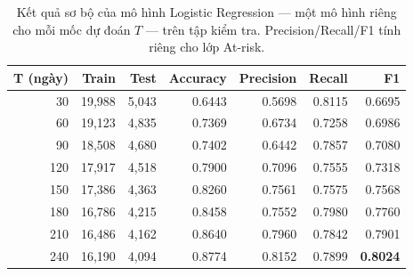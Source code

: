\begin{table}[H]
  \centering
  \caption{Kết quả sơ bộ của mô hình Logistic Regression --- một mô hình riêng cho mỗi mốc dự đoán $T$ --- trên tập kiểm tra. Precision/Recall/F1 tính riêng cho lớp At-risk.}
  \label{tab:snapshot_results}
  \small
  \begin{tabular}{rrrrrrr}
    \toprule
    \textbf{T (ngày)} & \textbf{Train} & \textbf{Test} & \textbf{Accuracy} & \textbf{Precision} & \textbf{Recall} & \textbf{F1} \\
    \midrule
    30 & 19{,}988 & 5{,}043 & 0.6443 & 0.5698 & 0.8115 & 0.6695 \\
    60 & 19{,}123 & 4{,}835 & 0.7369 & 0.6734 & 0.7258 & 0.6986 \\
    90 & 18{,}508 & 4{,}680 & 0.7402 & 0.6442 & 0.7857 & 0.7080 \\
    120 & 17{,}917 & 4{,}518 & 0.7900 & 0.7096 & 0.7555 & 0.7318 \\
    150 & 17{,}386 & 4{,}363 & 0.8260 & 0.7561 & 0.7575 & 0.7568 \\
    180 & 16{,}786 & 4{,}215 & 0.8458 & 0.7552 & 0.7980 & 0.7760 \\
    210 & 16{,}486 & 4{,}162 & 0.8640 & 0.7960 & 0.7842 & 0.7901 \\
    240 & 16{,}190 & 4{,}094 & 0.8774 & 0.8152 & 0.7899 & \textbf{0.8024} \\
    \bottomrule
  \end{tabular}
\end{table}
